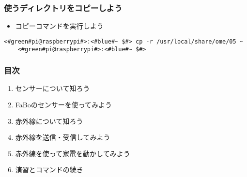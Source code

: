 

\begin{frame}[fragile]
    \frametitle{使うディレクトリをコピーしよう}
    \begin{itemize}
        \item コピーコマンドを実行しよう
    \end{itemize}
    \vspace{10pt}
    \begin{lstlisting}[title=ディレクトリのコピー,label=workfilecopy]
    <#green#pi@raspberrypi#>:<#blue#~ $#> cp -r /usr/local/share/ome/05 ~
    <#green#pi@raspberrypi#>:<#blue#~ $#>
    \end{lstlisting}
\end{frame}

\begin{frame}[fragile]
    \frametitle{目次}
    \begin{enumerate}
        \item センサーについて知ろう
        \item FaBoのセンサーを使ってみよう
        \item 赤外線について知ろう
        \item 赤外線を送信・受信してみよう
        \item 赤外線を使って家電を動かしてみよう
        \item 演習とコマンドの続き
    \end{enumerate}
\end{frame}
